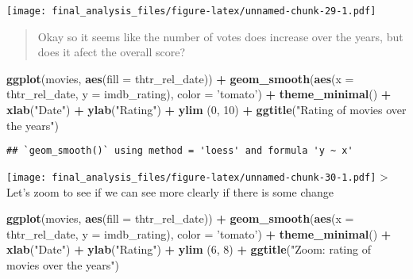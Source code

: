 \documentclass[]{article}
\newenvironment{Shaded}{\begin{snugshade}}{\end{snugshade}}
\newcommand{\KeywordTok}[1]{\textcolor[rgb]{0.13,0.29,0.53}{\textbf{#1}}}
\newcommand{\DataTypeTok}[1]{\textcolor[rgb]{0.13,0.29,0.53}{#1}}
\newcommand{\DecValTok}[1]{\textcolor[rgb]{0.00,0.00,0.81}{#1}}
\newcommand{\StringTok}[1]{\textcolor[rgb]{0.31,0.60,0.02}{#1}}
\newcommand{\OperatorTok}[1]{\textcolor[rgb]{0.81,0.36,0.00}{\textbf{#1}}}
\newcommand{\NormalTok}[1]{#1}
\begin{document}
\texttt{[image: final\_analysis\_files/figure-latex/unnamed-chunk-29-1.pdf]}

\begin{quote}
Okay so it seems like the number of votes does increase over the years,
but does it afect the overall score?
\end{quote}

\begin{Shaded}
\begin{Highlighting}[]
\KeywordTok{ggplot}\NormalTok{(movies, }\KeywordTok{aes}\NormalTok{(}\DataTypeTok{fill =}\NormalTok{ thtr_rel_date)) }\OperatorTok{+}
\StringTok{  }\KeywordTok{geom_smooth}\NormalTok{(}\KeywordTok{aes}\NormalTok{(}\DataTypeTok{x =}\NormalTok{ thtr_rel_date, }\DataTypeTok{y =}\NormalTok{ imdb_rating), }\DataTypeTok{color =} \StringTok{'tomato'}\NormalTok{) }\OperatorTok{+}
\StringTok{  }\KeywordTok{theme_minimal}\NormalTok{() }\OperatorTok{+}
\StringTok{  }\KeywordTok{xlab}\NormalTok{(}\StringTok{"Date"}\NormalTok{) }\OperatorTok{+}
\StringTok{  }\KeywordTok{ylab}\NormalTok{(}\StringTok{"Rating"}\NormalTok{) }\OperatorTok{+}
\StringTok{  }\KeywordTok{ylim}\NormalTok{ (}\DecValTok{0}\NormalTok{, }\DecValTok{10}\NormalTok{) }\OperatorTok{+}
\StringTok{  }\KeywordTok{ggtitle}\NormalTok{(}\StringTok{"Rating of  movies over the years"}\NormalTok{)}
\end{Highlighting}
\end{Shaded}

\begin{verbatim}
## `geom_smooth()` using method = 'loess' and formula 'y ~ x'
\end{verbatim}

\texttt{[image: final\_analysis\_files/figure-latex/unnamed-chunk-30-1.pdf]}
\textgreater{} Let's zoom to see if we can see more clearly if there is
some change

\begin{Shaded}
\begin{Highlighting}[]
\KeywordTok{ggplot}\NormalTok{(movies, }\KeywordTok{aes}\NormalTok{(}\DataTypeTok{fill =}\NormalTok{ thtr_rel_date)) }\OperatorTok{+}
\StringTok{  }\KeywordTok{geom_smooth}\NormalTok{(}\KeywordTok{aes}\NormalTok{(}\DataTypeTok{x =}\NormalTok{ thtr_rel_date, }\DataTypeTok{y =}\NormalTok{ imdb_rating), }\DataTypeTok{color =} \StringTok{'tomato'}\NormalTok{) }\OperatorTok{+}
\StringTok{  }\KeywordTok{theme_minimal}\NormalTok{() }\OperatorTok{+}
\StringTok{  }\KeywordTok{xlab}\NormalTok{(}\StringTok{"Date"}\NormalTok{) }\OperatorTok{+}
\StringTok{  }\KeywordTok{ylab}\NormalTok{(}\StringTok{"Rating"}\NormalTok{) }\OperatorTok{+}
\StringTok{  }\KeywordTok{ylim}\NormalTok{ (}\DecValTok{6}\NormalTok{, }\DecValTok{8}\NormalTok{) }\OperatorTok{+}
\StringTok{  }\KeywordTok{ggtitle}\NormalTok{(}\StringTok{"Zoom: rating of  movies over the years"}\NormalTok{)}
\end{Highlighting}
\end{Shaded}
\end{document}
